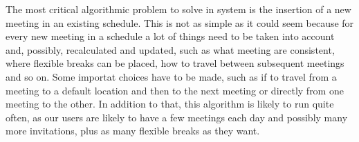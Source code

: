 The most critical algorithmic problem to solve in \projectname system is the insertion of a new meeting in an existing schedule. This is not as simple as it could seem because for every new meeting in a schedule a lot of things need to be taken into account and, possibly, recalculated and updated, such as what meeting are consistent, where flexible breaks can be placed, how to travel between subsequent meetings and so on. Some importat choices have to be made, such as if to travel from a meeting to a default location and then to the next meeting or directly from one meeting to the other. In addition to that, this algorithm is likely to run quite often, as our users are likely to have a few meetings each day and possibly many more invitations, plus as many flexible breaks as they want.